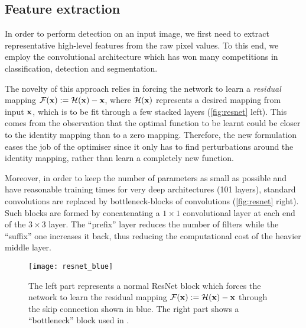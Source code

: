 
	\subsection{Feature extraction}\label{sec:resnet}
		In order to perform detection on an input image, we first need to extract representative high-level features from the raw pixel values. To this end, we employ the \RESNET{} convolutional architecture which has won many competitions in classification, detection and segmentation.

		The novelty of this approach relies in forcing the network to learn a \emph{residual} mapping \(\mathcal{F}(\mathbf{x}) := \mathcal{H}(\mathbf{x}) - \mathbf{x}\), where \(\mathcal{H}(\mathbf{x})\) represents a desired mapping from input \(\mathbf{x}\), which is to be fit through a few stacked layers (\autoref{fig:resnet} left). This comes from the observation that the optimal function to be learnt could be closer to the identity mapping than to a zero mapping. Therefore, the new formulation eases the job of the optimiser since it only has to find perturbations around the identity mapping, rather than learn a completely new function.

		Moreover, in order to keep the number of parameters as small as possible and have reasonable training times for very deep architectures (101 layers), standard convolutions are replaced by bottleneck-blocks of convolutions (\autoref{fig:resnet} right). Such blocks are formed by concatenating a \(1 \times 1\) convolutional layer at each end of the \(3 \times 3\) layer. The ``prefix'' layer reduces the number of filters while the ``suffix'' one increases it back, thus reducing the computational cost of the heavier middle layer.

		\begin{figure}
			\texttt{[image: resnet\_blue]}
			\caption[ResNet blocks]{
				The left part represents a normal ResNet block which forces the network to learn the residual mapping \(\mathcal{F}(\mathbf{x}) := \mathcal{H}(\mathbf{x}) - \mathbf{x}\) through the skip connection shown in blue. The right part shows a ``bottleneck'' block used in \RESNET{}.
				\citep{resnet}
				\label{fig:resnet}
			}
		\end{figure}

